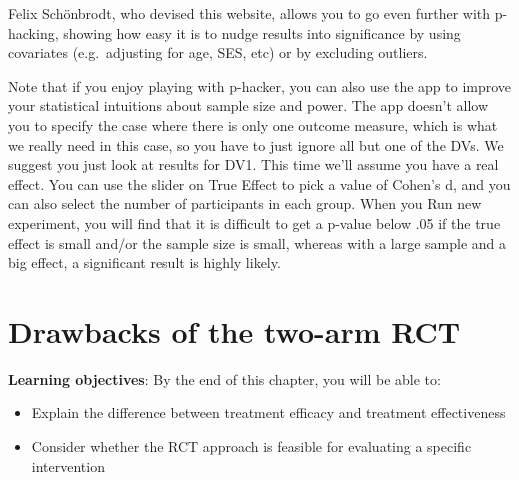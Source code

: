 \documentclass{krantz}
\begin{document}
Felix Schönbrodt, who devised this website, allows you to go even further with p-hacking, showing how easy it is to nudge results into significance by using covariates (e.g.~adjusting for age, SES, etc) or by excluding outliers.

Note that if you enjoy playing with p-hacker, you can also use the app to improve your statistical intuitions about sample size and power. The app doesn't allow you to specify the case where there is only one outcome measure, which is what we really need in this case, so you have to just ignore all but one of the DVs. We suggest you just look at results for DV1. This time we'll assume you have a real effect. You can use the slider on True Effect to pick a value of Cohen's d, and you can also select the number of participants in each group. When you Run new experiment, you will find that it is difficult to get a p-value below .05 if the true effect is small and/or the sample size is small, whereas with a large sample and a big effect, a significant result is highly likely.

\hypertarget{drawbacks}{%
\chapter{Drawbacks of the two-arm RCT}\label{drawbacks}}

\textbf{Learning objectives}: By the end of this chapter, you will be able to:

\begin{itemize}
\item
  Explain the difference between treatment efficacy and treatment effectiveness
\item
  Consider whether the RCT approach is feasible for evaluating a specific intervention
\end{itemize}
\end{document}
